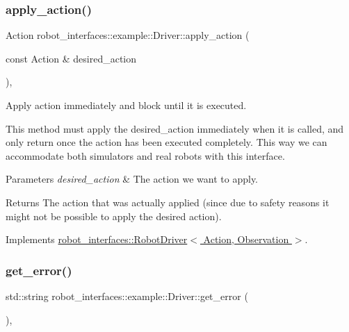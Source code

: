\subsubsection{\texorpdfstring{apply\+\_\+action()}{apply\_action()}}
{\footnotesize\ttfamily Action robot\+\_\+interfaces\+::example\+::\+Driver\+::apply\+\_\+action (\begin{DoxyParamCaption}\item[{const Action \&}]{desired\+\_\+action }\end{DoxyParamCaption})\hspace{0.3cm}{\ttfamily [inline]}, {\ttfamily [virtual]}}



Apply action immediately and block until it is executed. 

This method must apply the desired\+\_\+action immediately when it is called, and only return once the action has been executed completely. This way we can accommodate both simulators and real robots with this interface.


\begin{DoxyParams}{Parameters}
{\em desired\+\_\+action} & The action we want to apply. \\
\hline
\end{DoxyParams}
\begin{DoxyReturn}{Returns}
The action that was actually applied (since due to safety reasons it might not be possible to apply the desired action). 
\end{DoxyReturn}


Implements \hyperlink{classrobot__interfaces_1_1RobotDriver_a4294e522fcd12b38d69f7d53fae5d74a}{robot\+\_\+interfaces\+::\+Robot\+Driver$<$ Action, Observation $>$}.

\mbox{\label{classrobot__interfaces_1_1example_1_1Driver_a8465b912da8f11a6db271f11ff4eced1}} 
\subsubsection{\texorpdfstring{get\+\_\+error()}{get\_error()}}
{\footnotesize\ttfamily std\+::string robot\+\_\+interfaces\+::example\+::\+Driver\+::get\+\_\+error (\begin{DoxyParamCaption}{ }\end{DoxyParamCaption})\hspace{0.3cm}{\ttfamily [inline]}, {\ttfamily [virtual]}}



